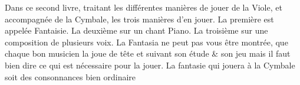 


Dans ce second livre, traitant les différentes manières de jouer de la Viole, et accompagnée de la Cymbale, %
les trois manières d'en jouer. La première est appelée Fantaisie. La deuxième sur un chant Piano. %
La troisième sur une composition de plusieurs voix.
La Fantasia ne peut pas vous être montrée, que chaque bon musicien la joue de tête et suivant son étude \& son jeu
mais il faut bien dire ce qui est nécessaire pour la jouer. La fantasie qui jouera à la Cymbale soit des consonnances bien ordinaire %




